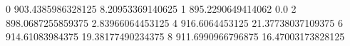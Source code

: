 0 903.4385986328125 8.20953369140625
1 895.2290649414062 0.0
2 898.0687255859375 2.83966064453125
4 916.6064453125 21.37738037109375
6 914.61083984375 19.38177490234375
8 911.6990966796875 16.47003173828125
